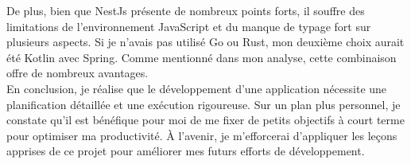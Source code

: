 De plus, bien que NestJs présente de nombreux points forts, il souffre des limitations de l'environnement JavaScript et du manque de typage fort sur plusieurs aspects.
Si je n'avais pas utilisé Go ou Rust, mon deuxième choix aurait été Kotlin avec Spring.
Comme mentionné dans mon analyse, cette combinaison offre de nombreux avantages.\\


En conclusion, je réalise que le développement d'une application nécessite une planification détaillée et une exécution rigoureuse.
Sur un plan plus personnel, je constate qu'il est bénéfique pour moi de me fixer de petits objectifs à court terme pour optimiser ma productivité.
À l'avenir, je m'efforcerai d'appliquer les leçons apprises de ce projet pour améliorer mes futurs efforts de développement.